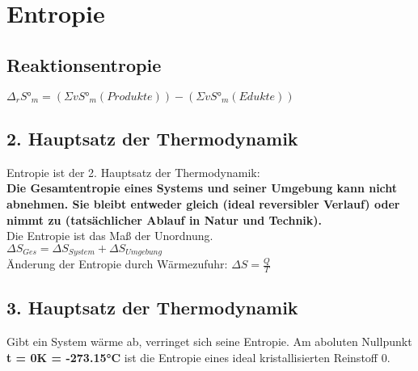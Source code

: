 \section{Entropie} \label{sec:entropie}

\subsection{Reaktionsentropie}
$\Delta_rS°_m = (\Sigma vS°_m(Produkte)) - (\Sigma vS°_m(Edukte))$

\subsection{ 2. Hauptsatz der Thermodynamik}
Entropie ist der 2. Hauptsatz der Thermodynamik: \\
\textbf{
Die Gesamtentropie eines Systems und seiner Umgebung kann nicht abnehmen. 
Sie bleibt entweder gleich (ideal reversibler Verlauf) oder nimmt zu (tatsächlicher Ablauf in Natur und Technik).
} \\
Die Entropie ist das Maß der Unordnung. \\
$\Delta S_{Ges} = \Delta S_{System} + \Delta S_{Umgebung}$ \\
Änderung der Entropie durch Wärmezufuhr:
$\Delta S = \frac{Q}{T}$ 

\subsection{ 3. Hauptsatz der Thermodynamik}
Gibt ein System wärme ab, verringet sich seine Entropie.
Am aboluten Nullpunkt \textbf{t = 0K = -273.15°C} ist die Entropie eines ideal kristallisierten Reinstoff 0.

